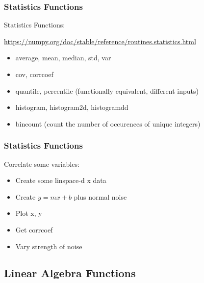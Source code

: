 \documentclass{beamer}
\begin{document}
\begin{frame}	
	\frametitle{Statistics Functions}
	
	\begin{block}{Statistics Functions:}
		\begin{scriptsize}
		\href{https://numpy.org/doc/stable/reference/routines.statistics.html}{https://numpy.org/doc/stable/reference/routines.statistics.html}
		\begin{itemize}
			\item average, mean, median, std, var
			\item cov, corrcoef
			\item quantile, percentile (functionally equivalent, different inputs)
			\item histogram, histogram2d, histogramdd
			\item bincount (count the number of occurences of unique integers)
		\end{itemize}
		\end{scriptsize}
	\end{block}
	
\end{frame}

\begin{frame}	
	\frametitle{Statistics Functions}
	
	\begin{exampleblock}{Correlate some variables:}
		\footnotesize
		\begin{itemize}
			\footnotesize
			\item Create some linspace-d x data
			\item Create $y = mx+b$ plus normal noise
			\item Plot x, y
			\item Get corrcoef
			\item Vary strength of noise
		\end{itemize}
	\end{exampleblock}
	
\end{frame}


\subsection{Linear Algebra Functions}
\end{document}
